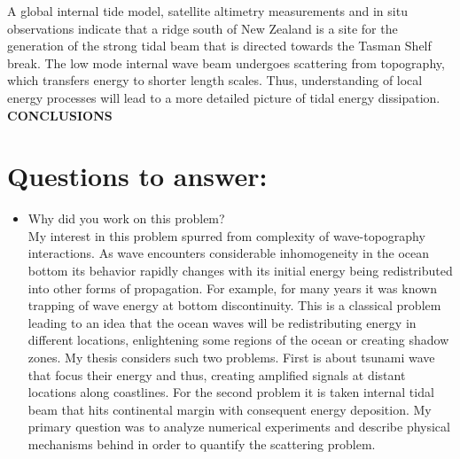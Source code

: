 A global internal tide model, satellite altimetry measurements and in situ observations indicate that a ridge south of New Zealand is a site for the generation of the strong tidal beam that is directed towards the Tasman Shelf break. The low mode internal wave beam undergoes scattering from topography, which transfers energy to shorter length scales. Thus, understanding of local energy processes will lead to a more detailed picture of tidal energy dissipation.\\
\textbf{CONCLUSIONS}

\section*{Questions to answer:}
\begin{itemize}
\item Why did you work on this problem?\\
My interest in this problem spurred from complexity of wave-topography interactions. As wave encounters considerable inhomogeneity in the ocean bottom its behavior rapidly changes with its initial energy being redistributed into other forms of propagation. For example, for many years it was known trapping of wave energy at bottom discontinuity. This is a classical problem leading to an idea that the ocean waves will be redistributing energy in different locations, enlightening some regions of the ocean or creating shadow zones. My thesis considers such two problems. First is about tsunami wave that focus their energy and thus, creating amplified signals at distant locations along coastlines. For the second problem it is taken internal tidal beam that hits continental margin with consequent energy deposition. My primary question was to analyze numerical experiments and describe physical mechanisms behind in order to quantify the scattering problem.\\


\end{itemize}
